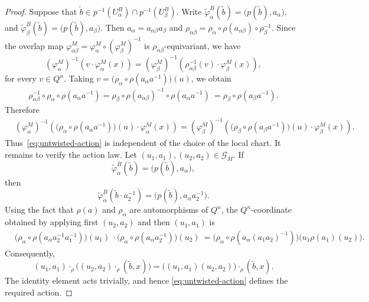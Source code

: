 \documentclass[11pt,a4paper]{article}
\numberwithin{equation}{section}
\theoremstyle{named}
\begin{document}
\begin{proof}
Suppose that \(\widetilde b\in p^{-1}(U_\alpha^B)\cap p^{-1}(U_\beta^B)\). Write \(\widetilde\varphi_\alpha^B(\widetilde b)
=\bigl(p(\widetilde b),a_\alpha\bigr),\) and \(\widetilde\varphi_\beta^B(\widetilde b) = \bigl(p(\widetilde b),a_\beta\bigr)\). Then $a_\alpha=a_{\alpha\beta}a_\beta$
and \(\rho_{\alpha\beta} = \rho_\alpha\circ\rho(a_{\alpha\beta}) \circ\rho_\beta^{-1}\). Since the overlap map $\varphi_{\alpha\beta}^M
=
\varphi_\alpha^M\circ(\varphi_\beta^M)^{-1}$
is \(\rho_{\alpha\beta}\)-equivariant, we have
\[
(\varphi_\alpha^M)^{-1}
\left(
v\cdot\varphi_\alpha^M(x)
\right)
=
(\varphi_\beta^M)^{-1}
\left(
\rho_{\alpha\beta}^{-1}(v)
\cdot\varphi_\beta^M(x)
\right),
\]
for every \(v\in Q^n\). Taking $v=
\bigl(
\rho_\alpha\circ\rho(a_\alpha a^{-1})
\bigr)(u)$,
we obtain
\begin{align*}
\rho_{\alpha\beta}^{-1}
\circ\rho_\alpha\circ\rho(a_\alpha a^{-1})
=
\rho_\beta\circ\rho(a_{\alpha\beta})^{-1}
\circ\rho(a_\alpha a^{-1})\
=
\rho_\beta\circ\rho(a_\beta a^{-1}).
\end{align*}
Therefore
\begin{align*}
&(\varphi_\alpha^M)^{-1}
\left(
\bigl(
\rho_\alpha\circ\rho(a_\alpha a^{-1})
\bigr)(u)
\cdot\varphi_\alpha^M(x)
\right)
=
(\varphi_\beta^M)^{-1}
\left(
\bigl(
\rho_\beta\circ\rho(a_\beta a^{-1})
\bigr)(u)
\cdot\varphi_\beta^M(x)
\right).
\end{align*}
Thus~\eqref{eq:untwisted-action} is independent of the choice of the local chart. It remains to verify the action law. Let $(u_1,a_1),(u_2,a_2)
\in
\mathcal G_M$.
If
\[
\widetilde\varphi_\alpha^B(\widetilde b)
=
\bigl(p(\widetilde b),a_\alpha\bigr),
\]
then
\[
\widetilde\varphi_\alpha^B
(\widetilde b\cdot a_2^{-1})
=\bigl(p(\widetilde b),a_\alpha a_2^{-1}\bigr).
\]
Using the fact that \(\rho(a)\) and \(\rho_\alpha\) are automorphisms of \(Q^n\), the \(Q^n\)-coordinate obtained by applying first \((u_2,a_2)\) and then \((u_1,a_1)\) is
\begin{align*}
&
\bigl(
\rho_\alpha\circ
\rho(a_\alpha a_2^{-1}a_1^{-1})
\bigr)(u_1)
\
\cdot
\bigl(
\rho_\alpha\circ
\rho(a_\alpha a_2^{-1})
\bigr)(u_2)
\
=
\bigl(
\rho_\alpha\circ
\rho(a_\alpha(a_1a_2)^{-1})
\bigr)
\bigl(u_1\rho(a_1)(u_2)\bigr).
\end{align*}
Consequently,
\[
(u_1,a_1)\cdot_\rho
\bigl((u_2,a_2)\cdot_\rho(\widetilde b,x)\bigr) =\bigl((u_1,a_1)(u_2,a_2)\bigr)
\cdot_\rho(\widetilde b,x).
\]
The identity element acts trivially, and hence \eqref{eq:untwisted-action} defines the required action.
\end{proof}
\end{document}
